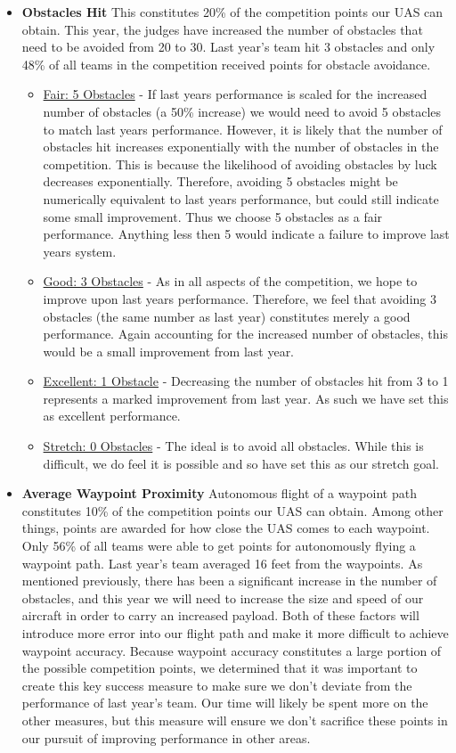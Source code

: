 \documentclass[]{auvsi_doc}
\begin{document}
\begin{itemize}
\item \textbf{Obstacles Hit} This constitutes 20\% of the competition points our UAS can obtain. This year, the judges have increased the number of obstacles that need to be avoided from 20 to 30. Last year's team hit 3 obstacles and only 48\% of all teams in the competition received points for obstacle avoidance.
	\begin{itemize}
	\item  \underline{Fair: 5 Obstacles} -  If last years performance is scaled for the increased number of obstacles (a 50\% increase) we would need to avoid 5 obstacles to match last years performance. However, it is likely that the number of obstacles hit increases exponentially with the number of obstacles in the competition. This is because the likelihood of avoiding obstacles by luck decreases exponentially. Therefore, avoiding 5 obstacles might be numerically equivalent to last years performance, but could still indicate some small improvement. Thus we choose 5 obstacles as a fair performance. Anything less then 5 would indicate a failure to improve last years system.
	\item \underline{Good: 3 Obstacles} -  As in all aspects of the competition, we hope to improve upon last years performance. Therefore, we feel that avoiding 3 obstacles (the same number as last year) constitutes merely a good performance. Again accounting for the increased number of obstacles, this would be a small improvement from last year.
	\item \underline{Excellent: 1 Obstacle} -  Decreasing the number of obstacles hit from 3 to 1 represents a marked improvement from last year. As such we have set this as excellent performance.
	\item \underline{Stretch: 0 Obstacles} - The ideal is to avoid all obstacles. While this is difficult, we do feel it is possible and so have set this as our stretch goal.
	\end{itemize}
\item \textbf{Average Waypoint Proximity} Autonomous flight of a waypoint path constitutes 10\% of the competition points our UAS can obtain. Among other things, points are awarded for how close the UAS comes to each waypoint. Only 56\% of all teams were able to get points for autonomously flying a waypoint path. Last year's team averaged 16 feet from the waypoints.  As mentioned previously, there has been a significant increase in the number of obstacles, and this year we will need to increase the size and speed of our aircraft in order to carry an increased payload. Both of these factors will introduce more error into our flight path and make it more difficult to achieve waypoint accuracy. Because waypoint accuracy constitutes a large portion of the possible competition points, we determined that it was important to create this key success measure to make sure we don't deviate from the performance of last year's team. Our time will likely be spent more on the other measures, but this measure will ensure we don't sacrifice these points in our pursuit of improving performance in other areas.

\end{itemize}
\end{document}
